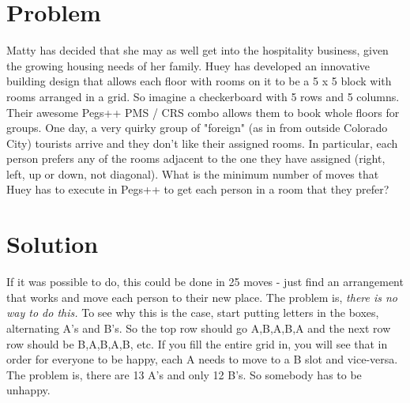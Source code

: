 \documentclass[11pt,a4paper]{report}
\theoremstyle{plain}
\theoremstyle{definition}
\theoremstyle{remark}
\begin{document}
\section*{Problem}
Matty has decided that she may as well get into the hospitality business, given the growing housing needs of her family.  Huey has developed an innovative building design that allows each floor with rooms on it to be a 5 x 5 block with rooms arranged in a grid.  So imagine a checkerboard with 5 rows and 5 columns.  Their awesome Pegs++ PMS / CRS combo allows them to book whole floors for groups.  One day, a very quirky group of "foreign" (as in from outside Colorado City) tourists arrive and they don't like their assigned rooms.  In particular, each person prefers any of the rooms adjacent to the one they have assigned (right, left, up or down, not diagonal).  What is the minimum number of moves that Huey has to execute in Pegs++ to get each person in a room that they prefer?

\newpage
\section*{Solution}
If it was possible to do, this could be done in 25 moves - just find an arrangement that works and move each person to their new place.  The problem is, \emph{there is no way to do this.}  To see why this is the case, start putting letters in the boxes, alternating A's and B's.  So the top row should go A,B,A,B,A and the next row row should be B,A,B,A,B, etc.  If you fill the entire grid in, you will see that in order for everyone to be happy, each A needs to move to a B slot and vice-versa.  The problem is, there are 13 A's and only 12 B's.  So somebody has to be unhappy.
 
\end{document}
